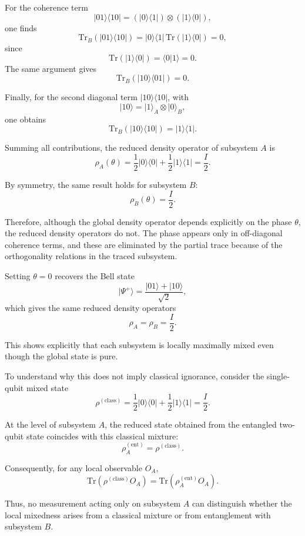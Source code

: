 \documentclass[a4paper]{article}
\begin{document}
For the coherence term
\[
|01\rangle\langle 10|
=
(|0\rangle\langle 1|)\otimes(|1\rangle\langle 0|),
\]
one finds
\[
\mathrm{Tr}_B(|01\rangle\langle 10|)
=
|0\rangle\langle 1|\,\mathrm{Tr}(|1\rangle\langle 0|)
=
0,
\]
since
\[
\mathrm{Tr}(|1\rangle\langle 0|)=\langle 0|1\rangle = 0.
\]
The same argument gives
\[
\mathrm{Tr}_B(|10\rangle\langle 01|) = 0.
\]

Finally, for the second diagonal term $|10\rangle\langle 10|$, with
\[
|10\rangle = |1\rangle_A \otimes |0\rangle_B,
\]
one obtains
\[
\mathrm{Tr}_B(|10\rangle\langle 10|) = |1\rangle\langle 1|.
\]

Summing all contributions, the reduced density operator of subsystem $A$ is
\[
\rho_A(\theta)
=
\frac{1}{2}|0\rangle\langle 0|
+
\frac{1}{2}|1\rangle\langle 1|
=
\frac{I}{2}.
\]

By symmetry, the same result holds for subsystem $B$:
\[
\rho_B(\theta) = \frac{I}{2}.
\]

Therefore, although the global density operator depends explicitly on the phase $\theta$, the reduced density operators do not. The phase appears only in off-diagonal coherence terms, and these are eliminated by the partial trace because of the orthogonality relations in the traced subsystem.

\medskip

Setting $\theta = 0$ recovers the Bell state
\[
|\Psi^+\rangle = \frac{|01\rangle + |10\rangle}{\sqrt{2}},
\]
which gives the same reduced density operators
\[
\rho_A = \rho_B = \frac{I}{2}.
\]

This shows explicitly that each subsystem is locally maximally mixed even though the global state is pure.

\medskip

To understand why this does not imply classical ignorance, consider the single-qubit mixed state
\[
\rho^{(\mathrm{class})}
=
\frac{1}{2}|0\rangle\langle 0|
+
\frac{1}{2}|1\rangle\langle 1|
=
\frac{I}{2}.
\]

At the level of subsystem $A$, the reduced state obtained from the entangled two-qubit state coincides with this classical mixture:
\[
\rho_A^{(\mathrm{ent})} = \rho^{(\mathrm{class})}.
\]

Consequently, for any local observable $O_A$,
\[
\mathrm{Tr}(\rho^{(\mathrm{class})} O_A)
=
\mathrm{Tr}(\rho_A^{(\mathrm{ent})} O_A).
\]

Thus, no measurement acting only on subsystem $A$ can distinguish whether the local mixedness arises from a classical mixture or from entanglement with subsystem $B$.
\end{document}

